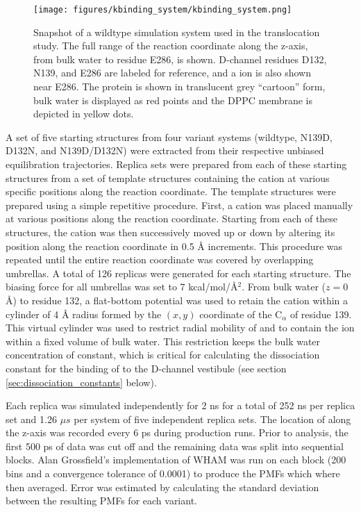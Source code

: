 \begin{figure}[htbp]
\centering
\texttt{[image: figures/kbinding\_system/kbinding\_system.png]}
\caption[Snapshot of a wildtype simulation system used in the  translocation study.]{Snapshot of a wildtype simulation system used in the  translocation study. The full range of the reaction coordinate along the z-axis, from bulk water to residue E286, is shown. D-channel residues D132, N139, and E286 are labeled for reference, and a  ion is also shown near E286. The protein is shown in translucent grey ``cartoon'' form, bulk water is displayed as red points and the DPPC membrane is depicted in yellow dots.}
\label{fig:k_binding_system}
\end{figure}

A set of five starting structures from four variant systems (wildtype, N139D, D132N, and N139D/D132N) were extracted from their respective unbiased equilibration trajectories. Replica sets were prepared from each of these starting structures from a set of template structures containing the cation at various specific positions along the reaction coordinate. The template structures were prepared using a simple repetitive procedure. First, a cation was placed manually at various positions along the reaction coordinate. Starting from each of these structures, the cation was then successively moved up or down by altering its position along the reaction coordinate in 0.5 Å increments. This procedure was repeated until the entire reaction coordinate was covered by overlapping umbrellas. A total of 126 replicas were generated for each starting structure. The biasing force for all umbrellas was set to 7 kcal/mol/Å$^2$. From bulk water ($z = 0$ Å) to residue 132, a flat-bottom potential was used to retain the cation within a cylinder of 4 Å radius formed by the $(x,y)$ coordinate of the C$_{\alpha}$ of residue 139. This virtual cylinder was used to restrict radial mobility of  and to contain the ion within a fixed volume of bulk water. This restriction keeps the bulk water concentration of  constant, which is critical for calculating the dissociation constant for the binding of  to the D-channel vestibule (see section \ref{sec:dissociation_constants} below).

Each replica was simulated independently for 2 ns for a total of 252 ns per replica set and 1.26 $\mu s$ per system of five independent replica sets. The location of  along the z-axis was recorded every 6 ps during production runs. Prior to analysis, the first 500 ps of data was cut off and the remaining data was split into sequential blocks. Alan Grossfield's implementation of WHAM \cite{Kumar:1995p5435} was run on each block (200 bins and a convergence tolerance of 0.0001) to produce the PMFs which where then averaged. Error was estimated by calculating the standard deviation between the resulting PMFs for each variant.

